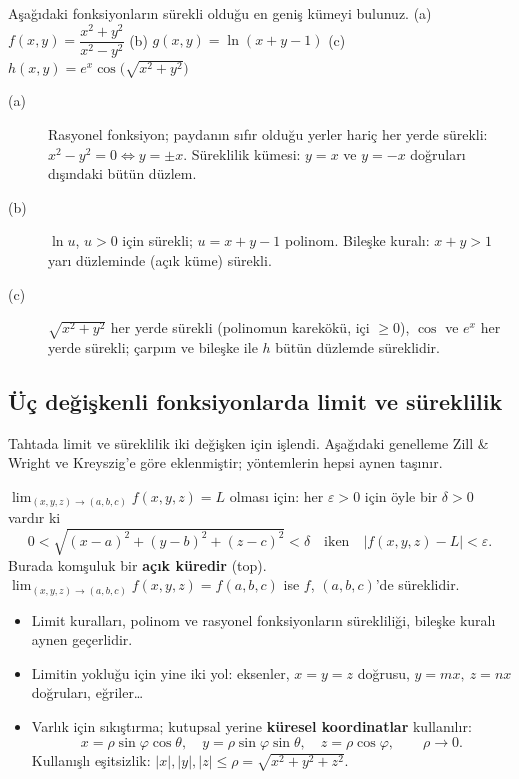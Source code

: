 \begin{soru}
Aşağıdaki fonksiyonların sürekli olduğu en geniş kümeyi bulunuz.
(a) $f(x,y)=\dfrac{x^2+y^2}{x^2-y^2}$ \quad (b) $g(x,y)=\ln(x+y-1)$ \quad (c) $h(x,y)=e^{x}\cos\!\big(\sqrt{x^2+y^2}\big)$
\end{soru}
\begin{cevap}
\begin{description}
  \item[(a)] Rasyonel fonksiyon; paydanın sıfır olduğu yerler hariç her yerde sürekli: $x^2-y^2=0\Leftrightarrow y=\pm x$.
  Süreklilik kümesi: $y=x$ ve $y=-x$ doğruları dışındaki bütün düzlem.
  \item[(b)] $\ln u$, $u>0$ için sürekli; $u=x+y-1$ polinom. Bileşke kuralı: $x+y>1$ yarı düzleminde (açık küme) sürekli.
  \item[(c)] $\sqrt{x^2+y^2}$ her yerde sürekli (polinomun karekökü, içi $\ge0$), $\cos$ ve $e^x$ her yerde sürekli;
  çarpım ve bileşke ile $h$ bütün düzlemde süreklidir.
\end{description}
\end{cevap}

\subsection{Üç değişkenli fonksiyonlarda limit ve süreklilik}

\begin{bilgi}
Tahtada limit ve süreklilik iki değişken için işlendi. Aşağıdaki genelleme Zill \& Wright ve Kreyszig'e göre eklenmiştir;
yöntemlerin hepsi aynen taşınır.
\end{bilgi}

\begin{tanim}
$\displaystyle\lim_{(x,y,z)\to(a,b,c)}f(x,y,z)=L$ olması için: her $\varepsilon>0$ için öyle bir $\delta>0$ vardır ki
\[
0<\sqrt{(x-a)^2+(y-b)^2+(z-c)^2}<\delta\quad\text{iken}\quad|f(x,y,z)-L|<\varepsilon .
\]
Burada komşuluk bir \textbf{açık küredir} (top). $\lim_{(x,y,z)\to(a,b,c)}f(x,y,z)=f(a,b,c)$ ise $f$, $(a,b,c)$'de
süreklidir.
\end{tanim}

\begin{itemize}
  \item Limit kuralları, polinom ve rasyonel fonksiyonların sürekliliği, bileşke kuralı aynen geçerlidir.
  \item Limitin yokluğu için yine iki yol: eksenler, $x=y=z$ doğrusu, $y=mx,\ z=nx$ doğruları, eğriler\dots
  \item Varlık için sıkıştırma; kutupsal yerine \textbf{küresel koordinatlar} kullanılır:
        \[x=\rho\sin\varphi\cos\theta,\quad y=\rho\sin\varphi\sin\theta,\quad z=\rho\cos\varphi,\qquad \rho\to0 .\]
        Kullanışlı eşitsizlik: $|x|,|y|,|z|\le\rho=\sqrt{x^2+y^2+z^2}$.
\end{itemize}

